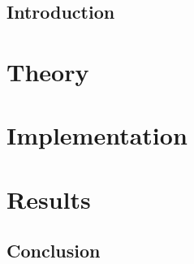 \documentclass[11pt,a4paper]{book}
\numberwithin{equation}{section}
\begin{document}
 

\cleardoublepage

\doublespacing
\tableofcontents
\singlespacing
 
\chapter{Introduction}

 

\part{Theory} 

 
\part{Implementation}


\part{Results}


\chapter{Conclusion}




\begin{changemargin}{0 cm}{4 cm}

\end{changemargin}
 
\end{document}
